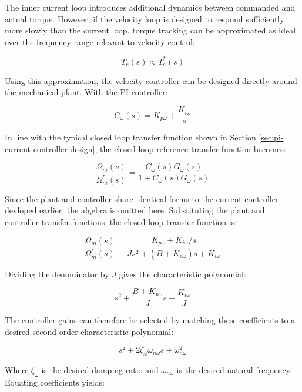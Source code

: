 \documentclass{article}
\begin{document}
The inner current loop introduces additional dynamics between commanded and actual torque. However, if the velocity loop is designed to respond sufficiently more slowly than the current loop, torque tracking can be approximated as ideal over the frequency range relevant to velocity control:

\begin{equation}
    T_e(s)\approx T_e^*(s)
\end{equation}

Using this approximation, the velocity controller can be designed directly around the mechanical plant. With the PI controller:

\begin{equation}
    C_\omega(s) = K_{p\omega} + \frac{K_{i\omega}}{s}
\end{equation}

In line with the typical closed loop transfer function shown in Section \ref{sec:pi-current-controller-design}, the closed-loop reference transfer function becomes:

\begin{equation}
    \frac{\Omega_m(s)}{\Omega_m^*(s)} = \frac{C_\omega(s)G_\omega(s)}{1+C_\omega(s)G_\omega(s)}
\end{equation}

Since the plant and controller share identical forms to the current controller devloped earlier, the algebra is omitted here. Substituting the plant and controller transfer functions, the closed-loop transfer function is:

\begin{equation}
    \frac{\Omega_m(s)}{\Omega_m^*(s)} = \frac{K_{p\omega} + K_{i\omega}/s}{Js^2 + (B + K_{p\omega})s + K_{i\omega}}
\end{equation}

Dividing the denominator by $J$ gives the characteristic polynomial:

\begin{equation}
    s^2 + \frac{B+K_{p\omega}}{J}s + \frac{K_{i\omega}}{J}
\end{equation}

The controller gains can therefore be selected by matching these coefficients to a desired second-order characteristic polynomial:

\begin{equation}
    s^2 + 2\zeta_\omega\omega_{n\omega}s + \omega_{n\omega}^2
\end{equation}

Where $\zeta_\omega$ is the desired damping ratio and $\omega_{n\omega}$ is the desired natural frequency. Equating coefficients yields:
\end{document}
